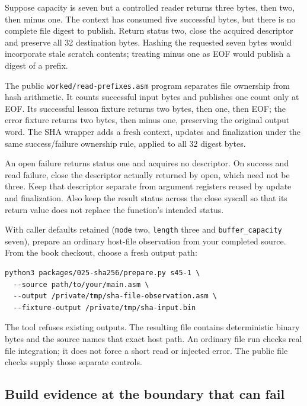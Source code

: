 Suppose capacity is seven but a controlled reader returns three bytes, then two,
then minus one. The context has consumed five successful bytes, but there is no
complete file digest to publish. Return status two, close the acquired descriptor
and preserve all 32 destination bytes. Hashing the requested seven bytes would
incorporate stale scratch contents; treating minus one as EOF would publish a
digest of a prefix.

The public \texttt{worked/read-prefixes.asm} program separates file ownership
from hash arithmetic. It counts successful input bytes and publishes one count
only at EOF. Its successful lesson fixture returns two bytes, then one, then
EOF; the error fixture returns two bytes, then minus one, preserving the original
output word. The SHA wrapper adds a fresh context, updates and finalization
under the same success/failure ownership rule, applied to all 32 digest bytes.



An open failure returns status one and acquires no descriptor. On success and
read failure, close the descriptor actually returned by open, which need not be
three. Keep that descriptor separate from argument registers reused by update
and finalization. Also keep the result status across the close syscall so that
its return value does not replace the function's intended status.

With caller defaults retained (\texttt{mode} two, \texttt{length} three and
\texttt{buffer\_capacity} seven), prepare an ordinary host-file observation from
your completed source. From the book checkout, choose a fresh output path:

\begin{Verbatim}[fontsize=\small]
python3 packages/025-sha256/prepare.py s45-1 \
  --source path/to/your/main.asm \
  --output /private/tmp/sha-file-observation.asm \
  --fixture-output /private/tmp/sha-input.bin
\end{Verbatim}

The tool refuses existing outputs. The resulting file contains deterministic
binary bytes and the source names that exact host path. An ordinary file run
checks real file integration; it does not force a short read or injected error.
The public file checks supply those separate controls.

\subsection*{Build evidence at the boundary that can fail}

